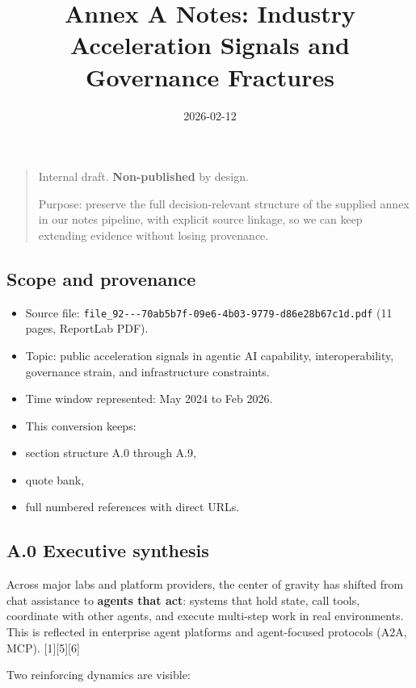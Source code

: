 \documentclass[
]{article}
\title{Annex A Notes: Industry Acceleration Signals and Governance
Fractures}
\author{}
\date{2026-02-12}
\providecommand{\tightlist}{%
  \setlength{\itemsep}{0pt}\setlength{\parskip}{0pt}}
\begin{document}
\maketitle

\begin{quote}
Internal draft. \textbf{Non-published} by design.

Purpose: preserve the full decision-relevant structure of the supplied
annex in our notes pipeline, with explicit source linkage, so we can
keep extending evidence without losing provenance.
\end{quote}

\hypertarget{scope-and-provenance}{%
\subsection{Scope and provenance}\label{scope-and-provenance}}

\begin{itemize}
\tightlist
\item
  Source file:
  \texttt{file\_92-\/-\/-70ab5b7f-09e6-4b03-9779-d86e28b67c1d.pdf} (11
  pages, ReportLab PDF).
\item
  Topic: public acceleration signals in agentic AI capability,
  interoperability, governance strain, and infrastructure constraints.
\item
  Time window represented: May 2024 to Feb 2026.
\item
  This conversion keeps:
\item
  section structure A.0 through A.9,
\item
  quote bank,
\item
  full numbered references with direct URLs.
\end{itemize}

\hypertarget{a.0-executive-synthesis}{%
\subsection{A.0 Executive synthesis}\label{a.0-executive-synthesis}}

Across major labs and platform providers, the center of gravity has
shifted from chat assistance to \textbf{agents that act}: systems that
hold state, call tools, coordinate with other agents, and execute
multi-step work in real environments. This is reflected in enterprise
agent platforms and agent-focused protocols (A2A, MCP).
{[}1{]}{[}5{]}{[}6{]}

Two reinforcing dynamics are visible:
\end{document}
